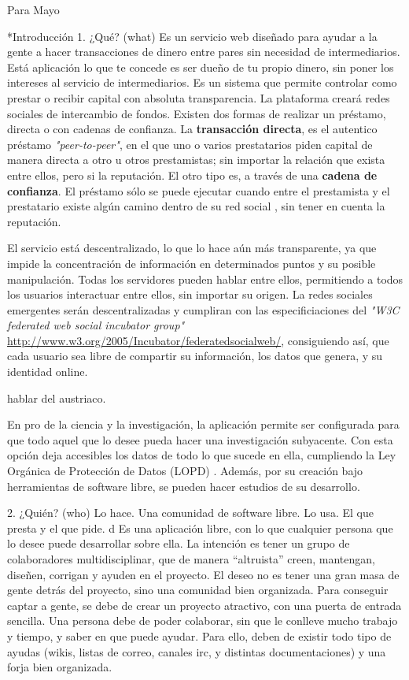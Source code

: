Para Mayo

*Introducción
1. ¿Qué? (what)
Es un servicio web diseñado para ayudar a la gente a hacer transacciones de dinero entre pares sin necesidad de intermediarios. Está aplicación lo que te concede es ser dueño de tu propio dinero, sin poner los intereses al servicio de intermediarios. Es un sistema que permite controlar como prestar o recibir capital con absoluta transparencia. La plataforma creará redes sociales de intercambio de fondos. Existen dos formas de realizar un préstamo, directa o con cadenas de confianza. La \textbf{transacción directa}, es el autentico préstamo \textit{"peer-to-peer"}, en el que uno o varios prestatarios piden capital de manera directa a otro u otros prestamistas; sin importar la relación que exista entre ellos, pero si la reputación. El otro tipo es, a través de una \textbf{cadena de confianza}. El préstamo sólo se puede ejecutar cuando entre el prestamista y el prestatario existe algún camino dentro de su red social \cite{ripple}, sin tener en cuenta la reputación.

El servicio está descentralizado, lo que lo hace aún más transparente, ya que impide la concentración de información en determinados puntos y su posible manipulación. Todas los servidores pueden hablar entre ellos, permitiendo a todos los usuarios interactuar entre ellos, sin importar su origen. La redes sociales emergentes serán descentralizadas y cumpliran con las especificiaciones del \textit{"W3C federated web social incubator group"} \url{http://www.w3.org/2005/Incubator/federatedsocialweb/}, consiguiendo así, que cada usuario sea libre de compartir su información, los datos que genera, y su identidad online.

hablar del austriaco. 

En pro de la ciencia y la investigación, la aplicación permite ser configurada para que todo aquel que lo desee pueda hacer una investigación subyacente. Con esta opción deja accesibles los datos de todo lo que sucede en ella, cumpliendo la Ley Orgánica de Protección de Datos (LOPD) \cite{LOPD}. Además, por su creación bajo herramientas de software libre, se pueden hacer estudios de su desarrollo.

2. ¿Quién? (who) 
Lo hace. Una comunidad de software libre.
Lo usa. El que presta y el que pide.
d
Es una aplicación libre, con lo que cualquier persona que lo desee puede desarrollar sobre ella. La intención es tener un grupo de colaboradores multidisciplinar, que de manera ``altruista'' creen, mantengan, diseñen, corrigan y ayuden en el proyecto. El deseo no es tener una gran masa de gente detrás del proyecto, sino una comunidad bien organizada. Para conseguir captar a gente, se debe de crear un proyecto atractivo, con una puerta de entrada sencilla. Una persona debe de poder colaborar, sin que le conlleve mucho trabajo y tiempo, y saber en que puede ayudar. Para ello, deben de existir todo tipo de ayudas (wikis, listas de correo, canales irc, y distintas documentaciones) y una forja bien organizada.

